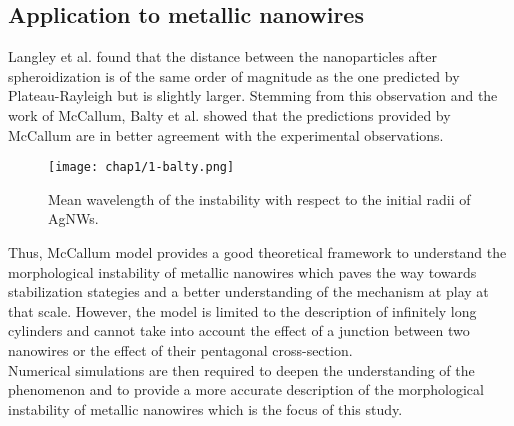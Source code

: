 \subsection{Application to metallic nanowires}
        Langley et al. \cite{Langley2014} found that the distance between the nanoparticles after spheroidization is of the same order of magnitude as the one predicted by Plateau-Rayleigh but is slightly larger. Stemming from this observation and the work of McCallum, Balty et al. \cite{BaltyBaretSilhanekNguyen2024} showed that the predictions provided by McCallum are in better agreement with the experimental observations.
        \begin{figure}[H]
                \centering
                \texttt{[image: chap1/1-balty.png]}
                \caption{Mean wavelength of the instability with respect to the initial radii of AgNWs. \cite{BaltyBaretSilhanekNguyen2024}}
                \label{fig:1-plateau-mccallum}
        \end{figure}
        Thus, McCallum model provides a good theoretical framework to understand the morphological instability of metallic nanowires which paves the way towards stabilization stategies and a better understanding of the mechanism at play at that scale. However, the model is limited to the description of infinitely long cylinders and cannot take into account the effect of a junction between two nanowires or the effect of their pentagonal cross-section.\\
        Numerical simulations are then required to deepen the understanding of the phenomenon and to provide a more accurate description of the morphological instability of metallic nanowires which is the focus of this study.